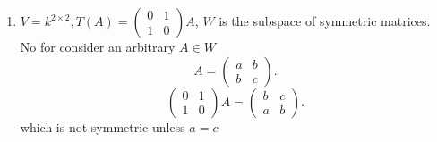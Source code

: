 \documentclass{article}
\begin{document}
\begin{enumerate}
        \item  $V = k^{2 \times 2}, T(A) = \begin{pmatrix} 0 & 1\\ 1 & 0 \end{pmatrix} A$, $W$ is the subspace of symmetric matrices.\\
            No for consider an arbitrary $A \in W$ 
            \[
                A = \begin{pmatrix} a & b \\ b & c\end{pmatrix} 
            .\] 
            \[
                \begin{pmatrix} 0 & 1\\ 1 & 0 \end{pmatrix} A = \begin{pmatrix} b & c \\ a & b \end{pmatrix} 
            .\] 
            which is not symmetric unless $a = c$
    \end{enumerate}

    
    
\end{document}
